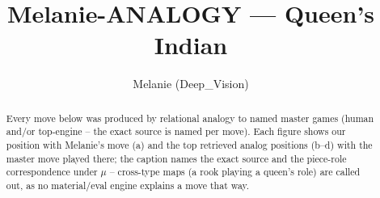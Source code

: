 \documentclass[11pt]{article}
\title{Melanie-ANALOGY — Queen's Indian}
\author{Melanie (Deep\_Vision)}
\date{}
\begin{document}
\maketitle

\begin{abstract}Every move below was produced by relational analogy to named master games (human and/or top-engine -- the exact source is named per move). Each figure shows our position with Melanie's move (a) and the top retrieved analog positions (b--d) with the master move played there; the caption names the exact source and the piece-role correspondence under $\mu$ -- cross-type maps (a rook playing a queen's role) are called out, as no material/eval engine explains a move that way.\end{abstract}

\begin{figure}[p]\centering
\begin{subfigure}{0.46\textwidth}\centering
\resizebox{\linewidth}{!}{%
\newchessgame
\chessboard[
  setfen={rn1qk2r/p1ppbppp/bp2pn2/8/2PP4/1P3NP1/P2BPP1P/RN1QKB1R w KQkq - 3 7},
  showmover=false,
  pgfstyle=straightmove, color=movearrow, markmove={f1-g2}
]}
\caption{}
\end{subfigure}\hfill
\begin{subfigure}{0.46\textwidth}\centering
\resizebox{\linewidth}{!}{%
\newchessgame
\chessboard[
  setfen={rn1qk2r/p1ppbppp/bp2pn2/8/2PP4/1P3NP1/P2BPP1P/RN1QKB1R w KQkq - 3 7},
  showmover=false,
  pgfstyle=straightmove, color=movearrow, markmove={f1-g2}
]}
\caption{}
\end{subfigure}
\\[4pt]
\begin{subfigure}{0.46\textwidth}\centering
\resizebox{\linewidth}{!}{%
\newchessgame
\chessboard[
  setfen={rn1qk2r/p1ppbppp/bp2pn2/8/2PP4/1P3NP1/P2BPP1P/RN1QKB1R w KQkq - 3 7},
  showmover=false,
  pgfstyle=straightmove, color=movearrow, markmove={f1-g2}
]}
\caption{}
\end{subfigure}\hfill
\begin{subfigure}{0.46\textwidth}\centering
\resizebox{\linewidth}{!}{%
\newchessgame
\chessboard[
  setfen={rn1qk2r/p1ppbppp/bp2pn2/8/2PP4/1P3NP1/P2BPP1P/RN1QKB1R w KQkq - 3 7},
  showmover=false,
  pgfstyle=straightmove, color=movearrow, markmove={f1-g2}
]}
\caption{}
\end{subfigure}

\end{figure}
\end{document}

